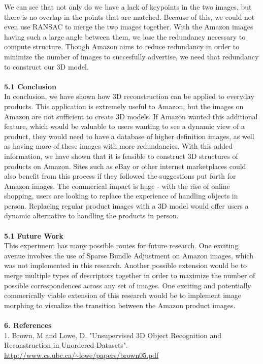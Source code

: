 \documentclass[12pt]{article}
\begin{document}
\begin{multicols}{2}
We can see that not only do we have a lack of keypoints in the two images, but there is no overlap in the points that are matched. Because of this, we could not even use RANSAC to merge the two images together. With the Amazon images having such a large angle between them, we lose the redundancy necessary to compute structure. Though Amazon aims to reduce redundancy in order to minimize the number of images to succesfully advertise, we need that redundancy to construct our 3D model.\\\\
{\large \textbf{5.1 Conclusion}}\\
In conclusion, we have shown how 3D reconstruction can be applied to everyday products. This application is extremely useful to Amazon, but the images on Amazon are not sufficient to create 3D models. If Amazon wanted this additional feature, which would be valuable to users wanting to see a dynamic view of a product, they would need to have a database of higher definition images, as well as having more of these images with more redundancies. With this added information, we have shown that it is feasible to construct 3D structures of products on Amazon. Sites such as eBay or other internet marketplaces could also benefit from this process if they followed the suggestions put forth for Amazon images. The commerical impact is huge - with the rise of online shopping, users are looking to replace the experience of handling objects in person. Replacing regular product images with a 3D model would offer users a dynamic alternative to handling the products in person. \\\\
{\large \textbf{5.1 Future Work}}\\
This experiment has many possible routes for future research. One exciting avenue involves the use of Sparse Bundle Adjustment on Amazon images, which was not implemented in this research. Another possible extension would be to merge multiple types of descriptors together in order to maximize the number of possible correspondences across any set of images. One exciting and potentially commerically viable extension of this research would be to implement image morphing to visualize the transition between the Amazon product images. \\\\
{\large \textbf{6. References}}\\
1. Brown, M and Lowe, D. "Unsupervised 3D Object Recognition and Reconstruction in Unordered Datasets". \url{http://www.cs.ubc.ca/~lowe/papers/brown05.pdf}\\\\

\end{multicols}
\end{document}
